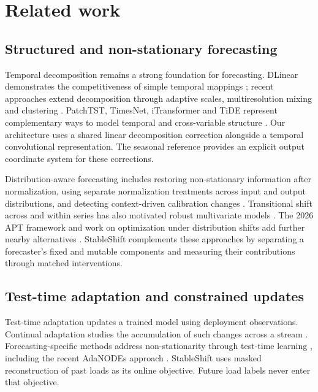 \documentclass[final,5p,times]{elsarticle}
\begin{document}
\section{Related work}
\subsection{Structured and non-stationary forecasting}
Temporal decomposition remains a strong foundation for forecasting. DLinear demonstrates the competitiveness of simple temporal mappings \cite{zeng2023transformers}; recent approaches extend decomposition through adaptive scales, multiresolution mixing and clustering \cite{hu2025adaptive,murad2025wpmixer,qiu2025duet}. PatchTST, TimesNet, iTransformer and TiDE represent complementary ways to model temporal and cross-variable structure \cite{nie2023patchtst,wu2023timesnet,liu2023itransformer,das2023tide}. Our architecture uses a shared linear decomposition correction alongside a temporal convolutional representation. The seasonal reference provides an explicit output coordinate system for these corrections.

Distribution-aware forecasting includes restoring non-stationary information after normalization, using separate normalization treatments across input and output distributions, and detecting context-driven calibration changes \cite{liu2022nonstationary,fan2023dishts,chen2024calibration}. Transitional shift across and within series has also motivated robust multivariate models \cite{he2025robust}. The 2026 APT framework and work on optimization under distribution shifts add further nearby alternatives \cite{apt2026,adamshift2026}. StableShift complements these approaches by separating a forecaster's fixed and mutable components and measuring their contributions through matched interventions.

\subsection{Test-time adaptation and constrained updates}
Test-time adaptation updates a trained model using deployment observations. Continual adaptation studies the accumulation of such changes across a stream \cite{wang2022continualtta}. Forecasting-specific methods address non-stationarity through test-time learning \cite{kim2025tta}, including the recent AdaNODEs approach \cite{adanodes2026}. StableShift uses masked reconstruction of past loads as its online objective. Future load labels never enter that objective.
\end{document}
